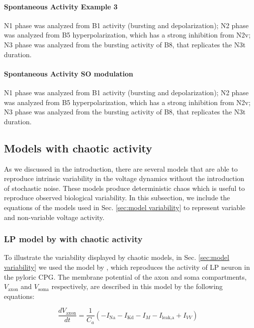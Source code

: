\paragraph{Spontaneous Activity Example 3}
N1 phase was analyzed from B1 activity (bursting and depolarization); N2 phase was analyzed from B5 hyperpolarization, which has a strong inhibition from N2v; N3 phase was analyzed from the bursting activity of B8, that replicates the N3t duration. 

\paragraph{Spontaneous Activity SO modulation}
N1 phase was analyzed from B1 activity (bursting and depolarization); N2 phase was analyzed from B5 hyperpolarization, which has a strong inhibition from N2v; N3 phase was analyzed from the bursting activity of B8, that replicates the N3t duration. 

\subsection{Models with chaotic activity}
\label{sec:model variability equations}
As we discussed in the introduction, there are several models that are able to reproduce intrinsic variability in the voltage dynamics without the introduction of stochastic noise. These models produce deterministic chaos which is useful to reproduce observed biological variability. In this subsection, we include the equations of the models used in Sec. \ref{sec:model variability} to represent variable and non-variable voltage activity.
\subsubsection{LP model by \textcite{nowotny_probing_2008} with chaotic activity}

To illustrate the variability displayed by chaotic models, in Sec. \ref{sec:model variability} we used the model by \textcite{nowotny_probing_2008}, which reproduces the activity of LP neuron in the pyloric CPG. The membrane potential of the axon and soma compartments, $V_{\text{axon}}$ and $V_{\text{soma}}$ respectively, are described in this model by the following equations:

\begin{equation}
	\frac{dV_{\text{axon}}}{dt} = \frac{1}{C_a} \left( -I_{\text{Na}} - I_{\text{Kd}} - I_M - I_{\text{leak,a}} + I_{VV} \right)
\end{equation}

